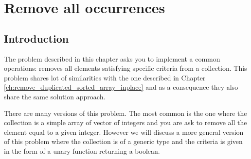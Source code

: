 %



\chapter{Remove all occurrences}
\label{ch:remove_all_occurrences_unsorted_array_inplace}
\section*{Introduction}
The problem described in this chapter asks you to implement a common operations: 
removes all elements satisfying specific criteria from a collection.
This problem shares  lot of similarities with the one described in Chapter \ref{ch:remove_duplicated_sorted_array_inplace}
and as a consequence they also share the same solution approach. 

There are many versions of this problem. The most common is the one where the collection is a simple array of vector of integers
and you are ask to remove all the element equal to a given integer.
However we will discuss a more general version of this problem where the collection is of a generic type 
and the criteria is given in the form of a unary function returning a boolean.

